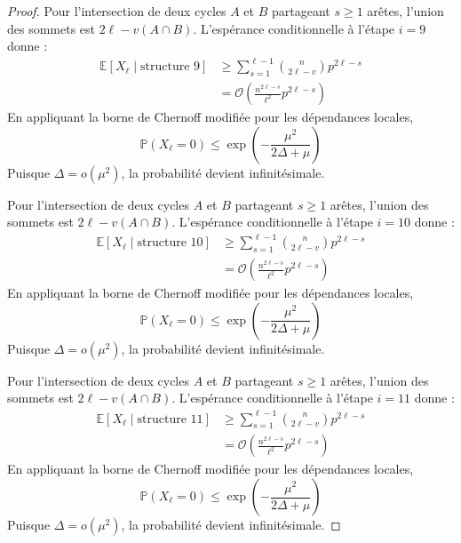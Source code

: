 \documentclass[11pt,a4paper]{article}
\theoremstyle{definition}
\begin{document}
\begin{proof}
Pour l'intersection de deux cycles $A$ et $B$ partageant $s \ge 1$ arêtes, l'union des sommets est $2\ell - v(A \cap B)$.
L'espérance conditionnelle à l'étape $i=9$ donne :
\begin{align*}
\mathbb{E}[X_\ell \mid \text{structure } 9] &\ge \sum_{s=1}^{\ell-1} \binom{n}{2\ell - v} p^{2\ell - s} \\
&= \mathcal{O}\left( \frac{n^{2\ell - s}}{\ell^2} p^{2\ell - s} \right)
\end{align*}
En appliquant la borne de Chernoff modifiée pour les dépendances locales,
\begin{equation}
\mathbb{P}(X_\ell = 0) \le \exp\left(-\frac{\mu^2}{2\Delta + \mu}\right)
\end{equation}
Puisque $\Delta = o(\mu^2)$, la probabilité devient infinitésimale.

Pour l'intersection de deux cycles $A$ et $B$ partageant $s \ge 1$ arêtes, l'union des sommets est $2\ell - v(A \cap B)$.
L'espérance conditionnelle à l'étape $i=10$ donne :
\begin{align*}
\mathbb{E}[X_\ell \mid \text{structure } 10] &\ge \sum_{s=1}^{\ell-1} \binom{n}{2\ell - v} p^{2\ell - s} \\
&= \mathcal{O}\left( \frac{n^{2\ell - s}}{\ell^2} p^{2\ell - s} \right)
\end{align*}
En appliquant la borne de Chernoff modifiée pour les dépendances locales,
\begin{equation}
\mathbb{P}(X_\ell = 0) \le \exp\left(-\frac{\mu^2}{2\Delta + \mu}\right)
\end{equation}
Puisque $\Delta = o(\mu^2)$, la probabilité devient infinitésimale.

Pour l'intersection de deux cycles $A$ et $B$ partageant $s \ge 1$ arêtes, l'union des sommets est $2\ell - v(A \cap B)$.
L'espérance conditionnelle à l'étape $i=11$ donne :
\begin{align*}
\mathbb{E}[X_\ell \mid \text{structure } 11] &\ge \sum_{s=1}^{\ell-1} \binom{n}{2\ell - v} p^{2\ell - s} \\
&= \mathcal{O}\left( \frac{n^{2\ell - s}}{\ell^2} p^{2\ell - s} \right)
\end{align*}
En appliquant la borne de Chernoff modifiée pour les dépendances locales,
\begin{equation}
\mathbb{P}(X_\ell = 0) \le \exp\left(-\frac{\mu^2}{2\Delta + \mu}\right)
\end{equation}
Puisque $\Delta = o(\mu^2)$, la probabilité devient infinitésimale.


\end{proof}
\end{document}
